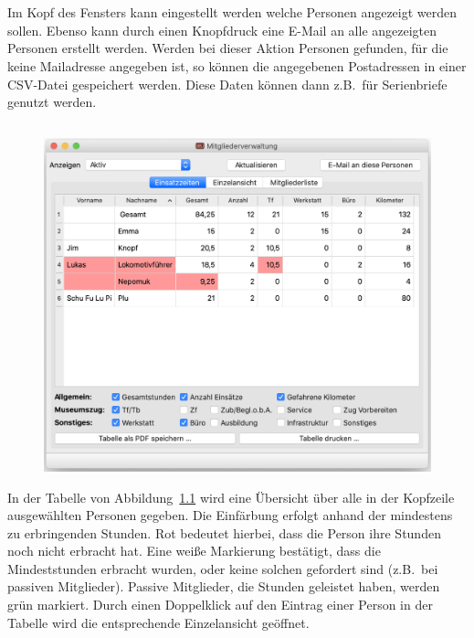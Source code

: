 \chapter{}\label{personal}
Im Kopf des Fensters kann eingestellt werden welche Personen angezeigt werden sollen.
Ebenso kann durch einen Knopfdruck eine E-Mail an alle angezeigten Personen erstellt werden.
Werden bei dieser Aktion Personen gefunden, für die keine Mailadresse angegeben ist,
so können die angegebenen Postadressen in einer CSV-Datei gespeichert werden.
Diese Daten können dann z.B.\ für Serienbriefe genutzt werden.

\section{}\label{personal:zeiten}
\begin{figure}[!h]
	\includegraphics[width=\textwidth]{img/personal_gesamt}
	\caption{}
	\label{fig:personal:zeiten}
\end{figure}
In der Tabelle von Abbildung~\ref{fig:personal:zeiten} wird eine Übersicht über alle in der Kopfzeile ausgewählten Personen gegeben.
Die Einfärbung erfolgt anhand der mindestens zu erbringenden Stunden.
Rot bedeutet hierbei, dass die Person ihre Stunden noch nicht erbracht hat.
Eine weiße Markierung bestätigt, dass die Mindeststunden erbracht wurden, oder keine solchen gefordert sind (z.B.\ bei passiven Mitglieder).
Passive Mitglieder, die Stunden geleistet haben, werden grün markiert.
Durch einen Doppelklick auf den Eintrag einer Person in der Tabelle wird die entsprechende Einzelansicht geöffnet.


